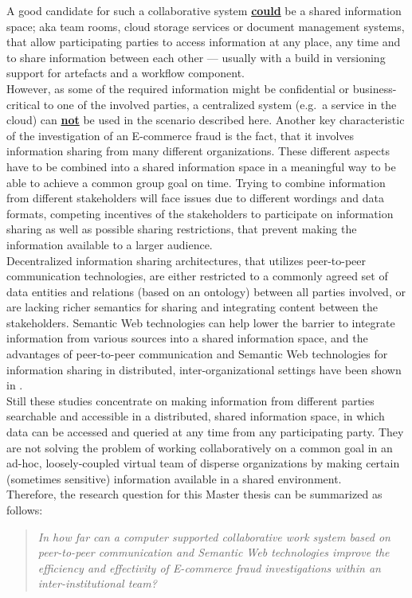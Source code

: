 A good candidate for such a collaborative system \textbf{\underline{could}} be a shared information space; aka team rooms, cloud storage services or document management systems, that allow participating parties to access information at any place, any time and to share information between each other --- usually with a build in versioning support for artefacts and a workflow component. \\

However, as some of the required information might be confidential or business-critical to one of the involved parties, a centralized system (e.g.\ a service in the cloud) can \textbf{\underline{not}} be used in the scenario described here. Another key characteristic of the investigation of an \gls{E-commerce} fraud is the fact, that it involves information sharing from many different organizations. These different aspects have to be combined into a shared information space in a meaningful way to be able to achieve a common group goal on time. Trying to combine information from different stakeholders will face issues due to different wordings and data formats, competing incentives of the stakeholders to participate on information sharing as well as possible sharing restrictions, that prevent making the information available to a larger audience. \\

Decentralized information sharing architectures, that utilizes peer-to-peer communication technologies, are either restricted to a commonly agreed set of data entities and relations (based on an ontology) between all parties involved, or are lacking richer semantics for sharing and integrating content between the stakeholders. Semantic Web technologies can help lower the barrier to integrate information from various sources into a shared information space, and the advantages of peer-to-peer communication and Semantic Web technologies for information sharing in distributed, inter-organizational settings have been shown in \citep{Staab2006}. \\

Still these studies concentrate on making information from different parties searchable and accessible in a distributed, shared information space, in which data can be accessed and queried at any time from any participating party. They are not solving the problem of working collaboratively on a common goal in an ad-hoc, loosely-coupled virtual team of disperse organizations by making certain (sometimes sensitive) information available in a shared environment. \\

Therefore, the research question for this Master thesis can be summarized as follows: \\[3em]

\begin{quotation}
  \textit{In how far can a computer supported collaborative work system based on peer-to-peer communication and Semantic Web technologies improve the efficiency and effectivity of \gls{E-commerce} fraud investigations within an inter-institutional team?}
\end{quotation}

